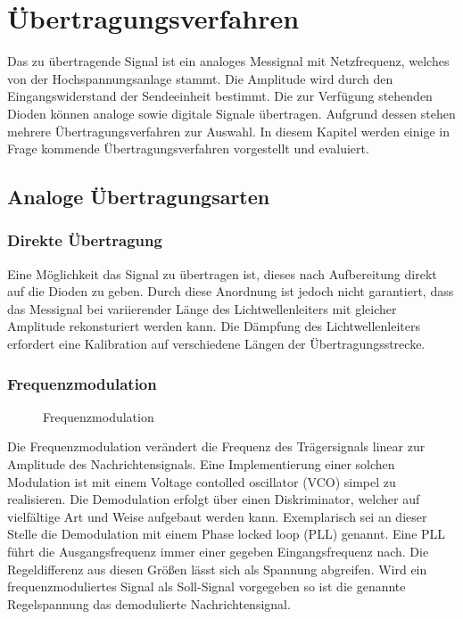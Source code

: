 \section{Übertragungsverfahren}
Das zu übertragende Signal ist ein analoges Messignal mit Netzfrequenz, welches von der Hochspannungsanlage stammt. Die Amplitude wird durch den Eingangswiderstand der Sendeeinheit bestimmt. Die zur Verfügung stehenden Dioden können analoge sowie digitale Signale übertragen. Aufgrund dessen stehen mehrere Übertragungsverfahren zur Auswahl.
In diesem Kapitel werden einige in Frage kommende Übertragungsverfahren vorgestellt und evaluiert.
\subsection{Analoge Übertragungsarten}
\subsubsection{Direkte Übertragung}
Eine Möglichkeit das Signal zu übertragen ist, dieses nach Aufbereitung direkt auf die Dioden zu geben.
Durch diese Anordnung ist jedoch nicht garantiert, dass das Messignal bei variierender Länge des Lichtwellenleiters mit gleicher Amplitude rekonsturiert werden kann. Die Dämpfung des Lichtwellenleiters erfordert eine Kalibration auf verschiedene Längen der Übertragungs\-strecke.
\subsubsection{Frequenzmodulation}
\begin{figure}[H]
\centering
  \scalebox{0.7}{\begin{large}$$\end{large}}
  \caption{Frequenzmodulation}
  \label{fig:fm}
\end{figure}
Die Frequenzmodulation verändert die Frequenz des Trägersignals linear zur Amplitude des Nachrichtensignals.
Eine Implementierung einer solchen Modulation ist mit einem Voltage contolled oscillator (VCO) simpel zu realisieren. Die Demodulation erfolgt über einen Diskriminator, welcher auf vielfältige Art und Weise aufgebaut werden kann. Exemplarisch sei an dieser Stelle die Demodulation mit einem Phase locked loop (PLL) genannt. Eine PLL führt die Ausgangsfrequenz immer einer gegeben Eingangsfrequenz nach. Die Regeldifferenz aus diesen Größen lässt sich als Spannung abgreifen. Wird ein frequenzmoduliertes Signal als Soll-Signal vorgegeben so ist die genannte Regelspannung das demodulierte Nachrichtensignal.

